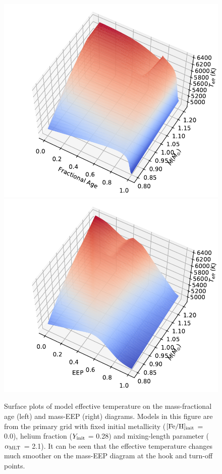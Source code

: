 \begin{figure}
        \includegraphics[width=1.\columnwidth]{2d_fage_data.pdf}
	\includegraphics[width=1.\columnwidth]{2d_EEP_data.pdf}
     \caption{Surface plots of model effective temperature on the mass-fractional age (left) and mass-EEP (right) diagrams. Models in this figure are from the primary grid with fixed initial metallicity ($\rm [Fe/H]_{init}$ = 0.0), helium fraction ($Y_{\rm init}$ = 0.28) and mixing-length parameter ($\alpha_{\rm MLT}$ = 2.1). It can be seen that the effective temperature changes much smoother on the mass-EEP diagram at the hook and turn-off points.}
    \label{fig:eep}
\end{figure}

